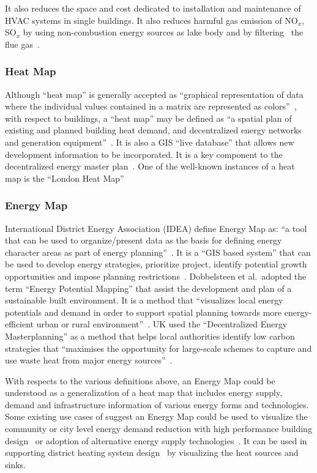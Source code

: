 \documentclass[hidelinks,12pt]{article}
\begin{document}
It also reduces the space and cost dedicated to installation and
maintenance of HVAC systems in single buildings. It also reduces
harmful gas emission of NO$_x$, SO$_x$ by using non-combustion energy
sources as lake body and by filtering~\cite{IDEA2012} the flue gas~\cite{veolia2014}.

\subsubsection{Heat Map}
Although ``heat map'' is generally accepted as ``graphical
representation of data where the individual values contained in a
matrix are represented as colors''~\cite{HeatmapWiki}, with respect to
buildings, a ``heat map'' may be defined as ``a spatial plan of
existing and planned building heat demand, and decentralized energy
networks and generation equipment''~\cite{decentralHeatMap2011}. It is
also a GIS ``live database'' that allows new development information
to be incorporated. It is a key component to the decentralized energy
master plan~\cite{decentralHeatMap2011}. One of the well-known
instances of a heat map is the ``London Heat
Map''~\cite{londonHeatMap}

\subsubsection{Energy Map}
International District Energy Association (IDEA) define Energy Map as:
``a tool that can be used to organize/present data as the basis for
defining energy character areas as part of energy
planning''~\cite{IDEA2012}. It is a ``GIS based system'' that can be
used to develop energy strategies, prioritize project, identify
potential growth opportunities and impose planning
restrictions~\cite{IDEA2012}. Dobbelsteen et al.\ adopted the term
``Energy Potential Mapping'' that assist the development and plan of a
sustainable built environment. It is a method that ``visualizes local
energy potentials and demand in order to support spatial planning
towards more energy-efficient urban or rural
environment''~\cite{Dobbelsteen2013}. UK used the ``Decentralized
Energy Masterplanning'' as a method that helps local authorities
identify low carbon strategies that ``maximises the opportunity for
large-scale schemes to capture and use waste heat from major energy
sources''~\cite{decentralHeatMap2011}.

With respects to the various definitions above, an Energy Map could be
understood as a generalization of a heat map that includes energy
supply, demand and infrastructure information of various energy forms
and technologies. Some existing use cases of suggest an Energy Map
could be used to visualize the community or city level energy demand
reduction with high performance building design~\cite{aacip2009} or
adoption of alternative energy supply
technologies~\cite{aacip2009}. It can be used in supporting district
heating system design~\cite{decentralHeatMap2011, Finney2012165} by
visualizing the heat sources and sinks.
\end{document}
